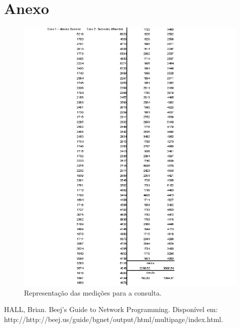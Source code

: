 \documentclass[11pt,twoside]{article}
\begin{document}
\section{Anexo}
\begin{figure}[htb]
  \centering
  \includegraphics[width=15cm]{medicoes.png} 
  \caption{Representação das medições para a consulta.}
  \label{fig:rtt}
\end{figure}

\begin{thebibliography}{99}
 HALL, Brian. Beej's Guide to Network Programming. Disponível em: http://http://beej.us/guide/bgnet/output/html/multipage/index.html.
\end{thebibliography}
\end{document}
